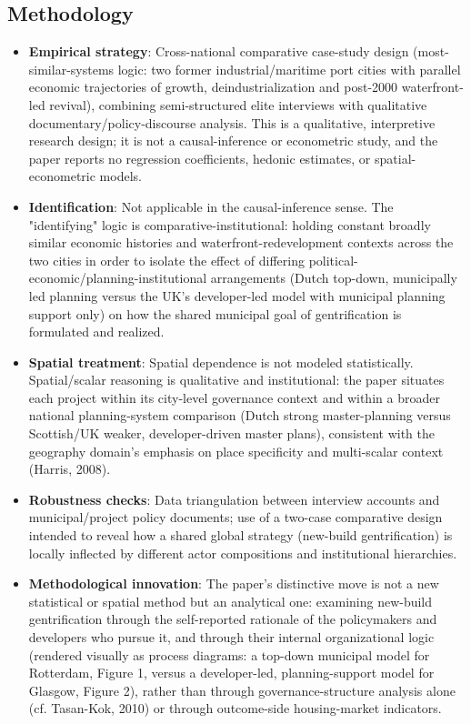 \subsection*{Methodology}

\begin{itemize}
  \item \textbf{Empirical strategy}: Cross-national comparative case-study design (most-similar-systems logic: two former industrial/maritime port cities with parallel economic trajectories of growth, deindustrialization and post-2000 waterfront-led revival), combining semi-structured elite interviews with qualitative documentary/policy-discourse analysis. This is a qualitative, interpretive research design; it is not a causal-inference or econometric study, and the paper reports no regression coefficients, hedonic estimates, or spatial-econometric models.
  \item \textbf{Identification}: Not applicable in the causal-inference sense. The "identifying" logic is comparative-institutional: holding constant broadly similar economic histories and waterfront-redevelopment contexts across the two cities in order to isolate the effect of differing political-economic/planning-institutional arrangements (Dutch top-down, municipally led planning versus the UK's developer-led model with municipal planning support only) on how the shared municipal goal of gentrification is formulated and realized.
  \item \textbf{Spatial treatment}: Spatial dependence is not modeled statistically. Spatial/scalar reasoning is qualitative and institutional: the paper situates each project within its city-level governance context and within a broader national planning-system comparison (Dutch strong master-planning versus Scottish/UK weaker, developer-driven master plans), consistent with the geography domain's emphasis on place specificity and multi-scalar context (Harris, 2008).
  \item \textbf{Robustness checks}: Data triangulation between interview accounts and municipal/project policy documents; use of a two-case comparative design intended to reveal how a shared global strategy (new-build gentrification) is locally inflected by different actor compositions and institutional hierarchies.
  \item \textbf{Methodological innovation}: The paper's distinctive move is not a new statistical or spatial method but an analytical one: examining new-build gentrification through the self-reported rationale of the policymakers and developers who pursue it, and through their internal organizational logic (rendered visually as process diagrams: a top-down municipal model for Rotterdam, Figure 1, versus a developer-led, planning-support model for Glasgow, Figure 2), rather than through governance-structure analysis alone (cf. Tasan-Kok, 2010) or through outcome-side housing-market indicators.
\end{itemize}

